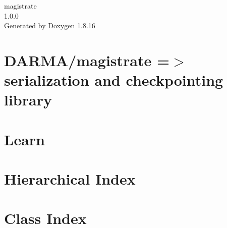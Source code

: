 \let\mypdfximage\pdfximage\def\pdfximage{\immediate\mypdfximage}\documentclass[twoside]{book}
\newcommand{\+}{\discretionary{\mbox{\scriptsize$\hookleftarrow$}}{}{}}
\newcommand{\clearemptydoublepage}{%
  \newpage{\pagestyle{empty}\cleardoublepage}%
}
\begin{document}
\hypersetup{pageanchor=false,
             bookmarksnumbered=true,
             pdfencoding=unicode
            }
\begin{titlepage}
\vspace*{7cm}
\begin{center}%
{\Large magistrate \\[1ex]\large 1.\+0.\+0 }\\
\vspace*{1cm}
{\large Generated by Doxygen 1.8.16}\\
\end{center}
\end{titlepage}
\clearemptydoublepage
{}
\tableofcontents
\clearemptydoublepage
{}
\hypersetup{pageanchor=true}

\chapter{D\+A\+R\+M\+A/magistrate =$>$ serialization and checkpointing library}
\label{index}\hypertarget{index}{}
\chapter{Learn}
\label{ckpt_learn}

\chapter{Hierarchical Index}

\chapter{Class Index}

\end{document}
